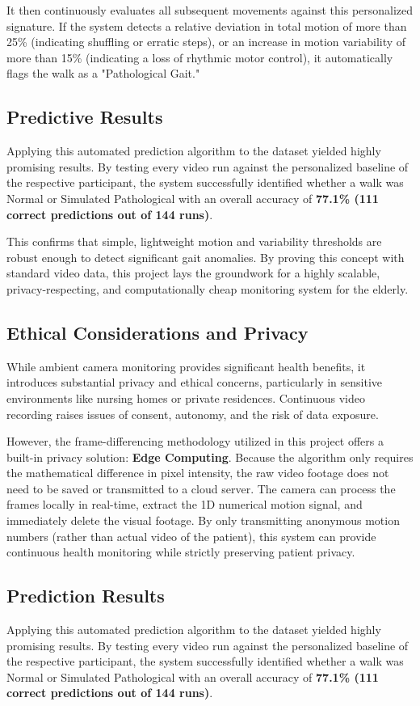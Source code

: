 \documentclass[12pt,a4paper]{article} %
\begin{document}
It then continuously evaluates all subsequent movements against this personalized signature. If the system detects a relative deviation in total motion of more than 25\% (indicating shuffling or erratic steps), or an increase in motion variability of more than 15\% (indicating a loss of rhythmic motor control), it automatically flags the walk as a "Pathological Gait."

\subsection{Predictive Results}
Applying this automated prediction algorithm to the dataset yielded highly promising results. By testing every video run against the personalized baseline of the respective participant, the system successfully identified whether a walk was Normal or Simulated Pathological with an overall accuracy of \textbf{77.1\% (111 correct predictions out of 144 runs)}. 

This confirms that simple, lightweight motion and variability thresholds are robust enough to detect significant gait anomalies. By proving this concept with standard video data, this project lays the groundwork for a highly scalable, privacy-respecting, and computationally cheap monitoring system for the elderly.

\subsection{Ethical Considerations and Privacy}
While ambient camera monitoring provides significant health benefits, it introduces substantial privacy and ethical concerns, particularly in sensitive environments like nursing homes or private residences. Continuous video recording raises issues of consent, autonomy, and the risk of data exposure. 

However, the frame-differencing methodology utilized in this project offers a built-in privacy solution: \textbf{Edge Computing}. Because the algorithm only requires the mathematical difference in pixel intensity, the raw video footage does not need to be saved or transmitted to a cloud server. The camera can process the frames locally in real-time, extract the 1D numerical motion signal, and immediately delete the visual footage. By only transmitting anonymous motion numbers (rather than actual video of the patient), this system can provide continuous health monitoring while strictly preserving patient privacy.

\subsection{Prediction Results}
Applying this automated prediction algorithm to the dataset yielded highly promising results. By testing every video run against the personalized baseline of the respective participant, the system successfully identified whether a walk was Normal or Simulated Pathological with an overall accuracy of \textbf{77.1\% (111 correct predictions out of 144 runs)}. 
\end{document}
